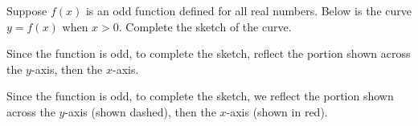 \begin{Mquestion}
Suppose $f(x)$ is an odd function defined for all real numbers. Below is the curve $y=f(x)$ when $x>0$. Complete the sketch of the curve.
\begin{center}\end{center}
\end{Mquestion}
\begin{hint}
Since the function is odd, to complete the sketch, reflect the portion shown across the $y$-axis, then the $x$-axis.
\end{hint}
\begin{answer}
\begin{center}\end{center}
\end{answer}
\begin{solution}
Since the function is odd, to complete the sketch, we reflect the portion shown across the $y$-axis (shown dashed), then the $x$-axis (shown in red).
\begin{center}
\end{center}
\end{solution}

\subsection*{\Procedural}


